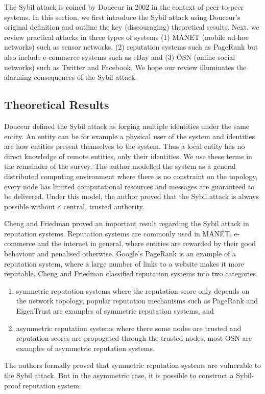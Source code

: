 The Sybil attack is coined by Douceur\cite{douceur2002sybil} in 2002 in the
context of peer-to-peer systems. In this section, we first introduce the Sybil
attack using Douceur's original definition and outline the key (discouraging)
theoretical results. Next, we review practical attacks in three types of systems
(1) MANET (mobile ad-hoc networks) such as sensor networks, (2) reputation
systems such as PageRank\cite{page1999pagerank} but also include e-commerce
systems such as eBay and (3) OSN (online social networks) such as Twitter and
Facebook. We hope our review illuminates the alarming consequences of the Sybil
attack.

\subsection{Theoretical Results}
Douceur defined the Sybil attack as forging multiple identities under the same
entity\cite{douceur2002sybil}. An entity can be for example a physical user of
the system and identities are how entities present themselves to the system.
Thus a local entity has no direct knowledge of remote entities, only their
identities. We use these terms in the remainder of the survey. The author
modelled the system as a general distributed computing environment where there
is no constraint on the topology, every node has limited computational resources
and messages are guaranteed to be delivered. Under this model, the author proved
that the Sybil attack is always possible without a central, trusted authority.


Cheng and Friedman proved an important result regarding the Sybil attack in
reputation systems\cite{cheng2005sybilproof}. Reputation systems are commonly
used in MANET, e-commerce and the internet in general, where entities are
rewarded by their good behaviour and penalised otherwise. Google's
PageRank\cite{page1999pagerank} is an example of a reputation system, where a
large number of links to a website makes it more reputable. Cheng and Friedman
classified reputation systems into two categories,
\begin{enumerate}
\item symmetric reputation systems where the reputation score only depends on
  the network topology, popular reputation mechanisms such as
  PageRank\cite{page1999pagerank} and EigenTrust\cite{kamvar2003eigentrust} are
  examples of symmetric reputation systems, and
    \item asymmetric reputation systems where there some nodes are trusted and
      reputation scores are propogated through the trusted nodes, most OSN are
      examples of asymmetric reputation systems.
\end{enumerate}
The authors formally proved that symmetric reputation systems are vulnerable to
the Sybil attack. But in the asymmetric case, it is possible to construct a
Sybil-proof reputation system.

